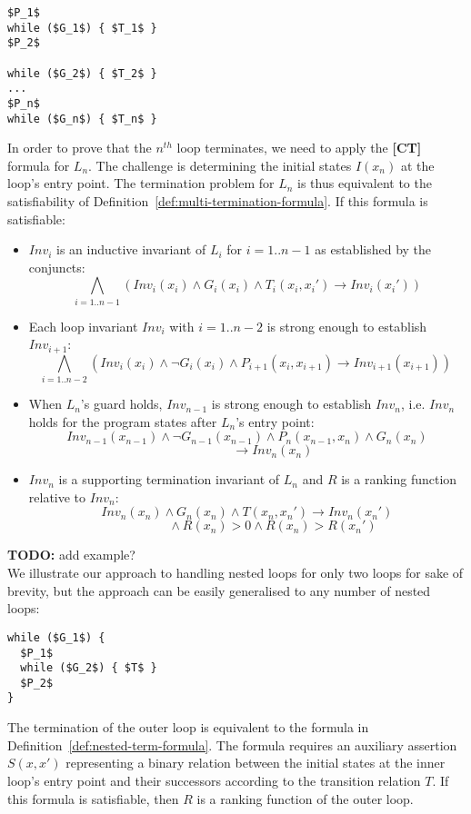 \documentclass[preprint]{sigplanconf}
\theoremstyle{definition}
\newcommand{\todo}[1]{{\bf TODO:} #1}
\begin{document}
\begin{lstlisting}[mathescape=true]
$P_1$
while ($G_1$) { $T_1$ }
$P_2$

while ($G_2$) { $T_2$ }
...
$P_n$
while ($G_n$) { $T_n$ }
\end{lstlisting}

In order to prove that the $n^{th}$ loop terminates, we need to apply the {\bf [CT]} formula for $L_n$.
The challenge is determining the initial states  $I(x_n)$ at the loop's entry point.  
The termination problem for $L_n$ is thus equivalent to the satisfiability of
Definition~\ref{def:multi-termination-formula}.  If this formula is satisfiable:
\begin{itemize}
\item $Inv_i$ is an inductive invariant of $L_i$ for $i=1..{n-1}$ as established by the conjuncts:
$$\bigwedge_{i=1..n{-}1} (Inv_i(x_i) \wedge G_i(x_i) \wedge T_i(x_i, x_i') \rightarrow Inv_i(x_i')) $$

\item Each loop invariant $Inv_i$ with $i=1..{n-2}$ is strong enough to establish $Inv_{i+1}$:
$$\bigwedge_{i=1..n{-}2} (Inv_i(x_i) \wedge \lnot G_i(x_i) \wedge P_{i+1}(x_i, x_{i+1}) {\rightarrow} Inv_{i+1}(x_{i+1})) ~$$

\item When $L_n$'s guard holds, $Inv_{n-1}$ 
is strong enough to establish $Inv_n$, i.e. $Inv_n$ holds for the program states after $L_n$'s entry point:
$$ Inv_{n-1}(x_{n-1}) \wedge \lnot G_{n-1}(x_{n-1}) \wedge P_n(x_{n-1},x_n) \wedge G_n(x_n) $$
$$\qquad\qquad\rightarrow Inv_n(x_n)$$

\item $Inv_n$ is a supporting termination invariant of $L_n$ and $R$ is a ranking function relative to $Inv_n$:
$$Inv_n(x_n) \wedge G_n(x_n) \wedge T(x_n, x_n') \rightarrow Inv_n(x_n')$$
$$ \qquad \qquad \wedge R(x_n) > 0 \wedge R(x_n) > R(x_n')$$
\end{itemize}

\todo{add example?}\\

%
We illustrate our approach to handling nested loops for only two loops for
sake of brevity, but the approach can be easily generalised to any number of
nested loops:
%
\begin{lstlisting}[mathescape=true]
while ($G_1$) { 
  $P_1$ 
  while ($G_2$) { $T$ }
  $P_2$
}
\end{lstlisting}

The termination of the outer loop is equivalent to the formula in
Definition~\ref{def:nested-term-formula}.  The formula requires an auxiliary
assertion $S(x,x')$ representing a binary relation between the initial
states at the inner loop's entry point and their successors according to the
transition relation $T$.  If this formula is satisfiable, then $R$ is a
ranking function of the outer loop.
\end{document}
